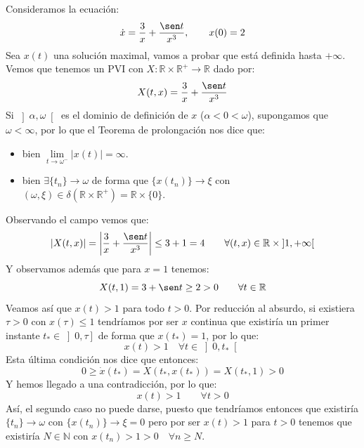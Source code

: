 \begin{ejemplo}
    Consideramos la ecuación:
    \begin{equation*}
        \dot{x} = \frac{3}{x} + \frac{\sen t}{x^3}, \qquad x(0) = 2
    \end{equation*}
    Sea $x(t)$ una solución maximal, vamos a probar que está definida hasta $+\infty$.\\

    \noindent
    Vemos que tenemos un PVI con $X:\mathbb{R}\times \mathbb{R}^+\to \mathbb{R}$ dado por:
    \begin{equation*}
        X(t,x) = \frac{3}{x} + \frac{\sen t}{x^3}
    \end{equation*}
    Si $\left]\alpha,\omega\right[$ es el dominio de definición de $x$ ($\alpha<0<\omega$), supongamos que $\omega<\infty$, por lo que el Teorema de prolongación nos dice que:
    \begin{itemize}
        \item bien $\lim\limits_{t\to \omega^-}|x(t)| = \infty$.
        \item bien $\exists \{t_n\}\to \omega$ de forma que $\{x(t_n)\}\to \xi$ con $(\omega,\xi)\in \delta(\mathbb{R}\times \mathbb{R}^+) = \mathbb{R}\times \{0\}$.
    \end{itemize}
    Observando el campo vemos que:
    \begin{equation*}
        |X(t,x)| = \left|\frac{3}{x}+\frac{\sen t}{x^3}\right| \leq 3 + 1 = 4 \qquad \forall (t,x)\in \mathbb{R}\times \left]1,+\infty\right[
    \end{equation*}
    Y observamos además que para $x=1$ tenemos:
    \begin{equation*}
        X(t,1) = 3 + \sen t \geq 2 > 0 \qquad \forall t\in \mathbb{R}
    \end{equation*}
    Veamos así que $x(t) > 1$ para todo $t>0$. Por reducción al absurdo, si existiera $\tau > 0$ con $x(\tau)\leq 1$ tendríamos por ser $x$ continua que existiría un primer instante $t_\ast \in \left]0,\tau\right]$ de forma que $x(t_\ast) = 1$, por lo que:
    \begin{equation*}
        x(t) > 1 \quad \forall t\in \left]0,t_\ast\right[
    \end{equation*}
    Esta última condición nos dice que entonces:
    \begin{equation*}
        0\geq \dot{x}(t_\ast) = X(t_\ast,x(t_\ast)) = X(t_\ast,1) > 0
    \end{equation*}
    Y hemos llegado a una contradicción, por lo que:
    \begin{equation*}
        x(t) > 1 \qquad \forall t>0
    \end{equation*}
    Así, el segundo caso no puede darse, puesto que tendríamos entonces que existiría $\{t_n\}\to \omega$ con $\{x(t_n)\}\to \xi = 0$ pero por ser $x(t)>1$ para $t>0$ tenemos que existiría $N\in \mathbb{N}$ con $x(t_n)>1>0 \quad \forall n\geq N$.\\


\end{ejemplo}
